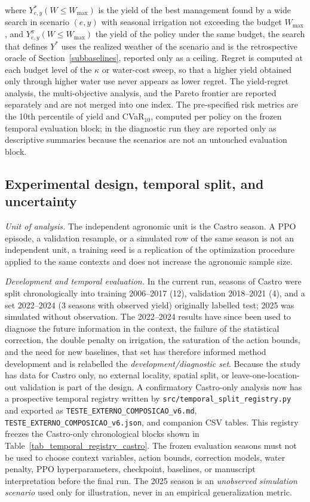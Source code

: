 \documentclass[times,final,authoryear]{elsarticle}
\begin{document}
where $Y^{*}_{e,y}(W \leq W_{\max})$ is the yield of the best management found by a wide search in scenario $(e,y)$ with seasonal irrigation not exceeding the budget $W_{\max}$, and $Y^{\pi}_{e,y}(W \leq W_{\max})$ the yield of the policy under the same budget, the search that defines $Y^{*}$ uses the realized weather of the scenario and is the retrospective oracle of Section~\ref{subbaselines}, reported only as a ceiling. Regret is computed at each budget level of the $\kappa$ or water-cost sweep, so that a higher yield obtained only through higher water use never appears as lower regret. The yield-regret analysis, the multi-objective analysis, and the Pareto frontier are reported separately and are not merged into one index. The pre-specified risk metrics are the 10th percentile of yield and CVaR$_{10}$, computed per policy on the frozen temporal evaluation block; in the diagnostic run they are reported only as descriptive summaries because the scenarios are not an untouched evaluation block.


\subsection{Experimental design, temporal split, and uncertainty}
\label{subdesign}

\emph{Unit of analysis.} The independent agronomic unit is the Castro season. A PPO episode, a validation resample, or a simulated row of the same season is not an independent unit, a training seed is a replication of the optimization procedure applied to the same contexts and does not increase the agronomic sample size.

\emph{Development and temporal evaluation.} In the current run, seasons of Castro were split chronologically into training 2006--2017 (12), validation 2018--2021 (4), and a set 2022--2024 (3 seasons with observed yield) originally labelled test; 2025 was simulated without observation. The 2022--2024 results have since been used to diagnose the future information in the context, the failure of the statistical correction, the double penalty on irrigation, the saturation of the action bounds, and the need for new baselines, that set has therefore informed method development and is relabelled the \emph{development/diagnostic set}. Because the study has data for Castro only, no external locality, spatial split, or leave-one-location-out validation is part of the design. A confirmatory Castro-only analysis now has a prospective temporal registry written by \texttt{src/temporal\_split\_registry.py} and exported as \texttt{TESTE\_EXTERNO\_COMPOSICAO\_v6.md}, \texttt{TESTE\_EXTERNO\_COMPOSICAO\_v6.json}, and companion CSV tables. This registry freezes the Castro-only chronological blocks shown in Table~\ref{tab_temporal_registry_castro}. The frozen evaluation seasons must not be used to choose context variables, action bounds, correction models, water penalty, PPO hyperparameters, checkpoint, baselines, or manuscript interpretation before the final run. The 2025 season is an \emph{unobserved simulation scenario} used only for illustration, never in an empirical generalization metric.
\end{document}
